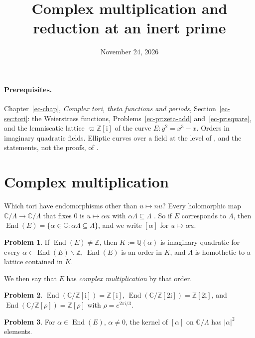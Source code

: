 \documentclass[reqno]{amsart}
\title{Complex multiplication and reduction at an inert prime}
\author{}
\date{November 24, 2026}
\newcounter{chap}
\theoremstyle{definition}
\newtheorem{problem}{Problem}[section]
\theoremstyle{plain}
\newcommand{\Z}{\mathbb{Z}}
\newcommand{\Q}{\mathbb{Q}}
\newcommand{\C}{\mathbb{C}}
\newcommand{\ii}{\mathrm{i}}
\newcommand{\End}{\operatorname{End}}
\begin{document}
\maketitle
{}\label{chap}

\paragraph{Prerequisites.}
Chapter~\ref{ec-chap}, \emph{Complex tori, theta functions and periods}, Section~\ref{ec-sec:tori}: the Weierstrass functions, Problems~\ref{ec-pr:zeta-add} and~\ref{ec-pr:square}, and the lemniscatic lattice \(\varpi\Z[\ii]\) of the curve \(E \colon y^2 = x^3 - x\).  Orders in imaginary quadratic fields.  Elliptic curves over a field at the level of \cite[Ch.~III]{Si1}, and the statements, not the proofs, of \cite[Ch.~IV, \S\S V.1--V.4, Ch.~VI]{Si1}.

\section{Complex multiplication}\label{sec:cm}

Which tori have endomorphisms other than \(u \mapsto nu\)?  Every holomorphic map \(\C/\Lambda \to \C/\Lambda\) that fixes \(0\) is \(u \mapsto \alpha u\) with \(\alpha\Lambda \subseteq \Lambda\) \cite[Thm.~VI.4.1]{Si1}.  So if \(E\) corresponds to \(\Lambda\), then \(\End(E) = \{\alpha \in \C : \alpha\Lambda \subseteq \Lambda\}\), and we write \([\alpha]\) for \(u \mapsto \alpha u\).

\begin{problem}\label{pr:cm-order}
If \(\End(E) \ne \Z\), then \(K := \Q(\alpha)\) is imaginary quadratic for every \(\alpha \in \End(E) \smallsetminus \Z\), \(\End(E)\) is an order in \(K\), and \(\Lambda\) is homothetic to a lattice contained in \(K\).
\end{problem}

We then say that \(E\) has \emph{complex multiplication} by that order.

\begin{problem}\label{pr:cm-examples}
\(\End(\C/\Z[\ii]) = \Z[\ii]\), \(\End(\C/\Z[2\ii]) = \Z[2\ii]\), and \(\End(\C/\Z[\rho]) = \Z[\rho]\) with \(\rho = e^{2\pi\ii/3}\).
\end{problem}

\begin{problem}\label{pr:deg}
For \(\alpha \in \End(E)\), \(\alpha \ne 0\), the kernel of \([\alpha]\) on \(\C/\Lambda\) has \(\lvert\alpha\rvert^2\) elements.
\end{problem}
\end{document}
